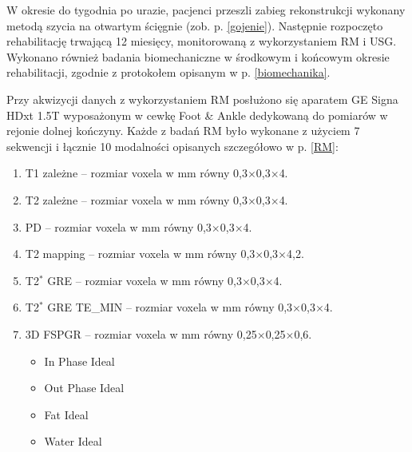 W okresie do tygodnia po urazie, pacjenci przeszli zabieg rekonstrukcji wykonany metodą szycia na otwartym ścięgnie (zob. p. \ref{gojenie}). Następnie rozpoczęto rehabilitację trwającą 12 miesięcy, monitorowaną z wykorzystaniem RM i USG. Wykonano również badania biomechaniczne w środkowym i końcowym okresie rehabilitacji, zgodnie z protokołem opisanym w p. \ref{biomechanika}.

Przy akwizycji danych z wykorzystaniem RM posłużono się aparatem GE Signa HDxt 1.5T wyposażonym w cewkę Foot \& Ankle dedykowaną do pomiarów w rejonie dolnej kończyny. Każde z badań RM było wykonane z użyciem 7 sekwencji i łącznie 10 modalności opisanych szczegółowo w p. \ref{RM}:
\begin{enumerate}
	\item T1 zależne -- rozmiar voxela w mm równy 0,3$\times$0,3$\times$4.
	\item T2 zależne -- rozmiar voxela w mm równy 0,3$\times$0,3$\times$4.
	\item PD -- rozmiar voxela w mm równy 0,3$\times$0,3$\times$4.
	\item T2 mapping -- rozmiar voxela w mm równy 0,3$\times$0,3$\times$4,2.
	\item T2$^\ast$ GRE -- rozmiar voxela w mm równy 0,3$\times$0,3$\times$4.
	\item T2$^\ast$ GRE TE\_MIN -- rozmiar voxela w mm równy 0,3$\times$0,3$\times$4.
	\item 3D FSPGR -- rozmiar voxela w mm równy 0,25$\times$0,25$\times$0,6.
	\begin{itemize}
		\item In Phase Ideal
		\item Out Phase Ideal
		\item Fat Ideal
		\item Water Ideal 
	\end{itemize}
\end{enumerate}

